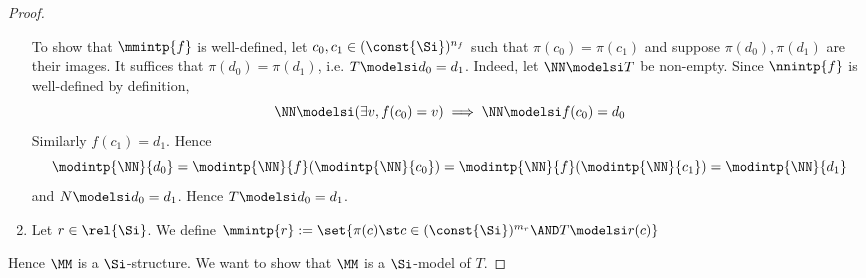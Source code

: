 \begin{proof}
\begin{enumerate}
        To show that $\mmintp{f}$ is well-defined,
        let $c_0,c_1 \in (\const{\Si})^{n_f}$ 
        such that $\pi(c_0) = \pi(c_1)$ and
        suppose $\pi(d_0),\pi(d_1)$ are their images.
        It suffices that $\pi(d_0) = \pi(d_1)$, i.e. $T \modelsi d_0 = d_1$.
        Indeed, let $\NN \modelsi T$ be non-empty.
        Since $\nnintp{f}$ is well-defined by definition,
        \[
            \NN \modelsi (\exists v, f(c_0) = v) 
            \implies 
            \NN \modelsi f(c_0) = d_0
        \]
        Similarly $f(c_1) = d_1$. Hence 
        \[\modintp{\NN}{d_0} = \modintp{\NN}{f}(\modintp{\NN}{c_0})
        = \modintp{\NN}{f}(\modintp{\NN}{c_1}) = \modintp{\NN}{d_1}\]
        and $N \modelsi d_0 = d_1$.
        Hence $T \modelsi d_0 = d_1$.
        \item Let $r \in \rel{\Si}$. 
        We define $\mmintp{r} := 
        \set{\pi(c) \st c \in (\const{\Si})^{m_r} \AND T \modelsi r(c)}$
    \end{enumerate}
    Hence $\MM$ is a $\Si$-structure.
    We want to show that $\MM$ is a $\Si$-model of $T$.


\end{proof}
